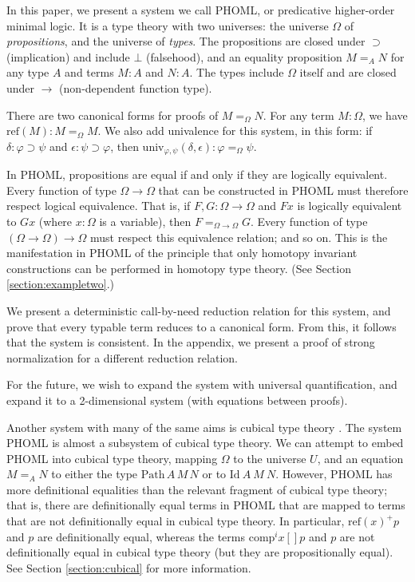 \documentclass[a4paper,UKenglish]{lipics-v2016}
\newcommand*{\reff}[1]{\ensuremath{\mathrm{ref} \left( {#1} \right)}}
\newcommand*{\univ}[4]{\ensuremath{\mathrm{univ}_{{#1}, {#2}} \left({#3} , {#4} \right)}}
\newcommand{\Path}[3]{\ensuremath{\mathrm{Path} \, {#1} \, {#2} \, {#3}}}
\theoremstyle{plain}
\theoremstyle{definition}
\begin{document}
In this paper, we present a system we call PHOML, or predicative higher-order minimal logic.  It is a type theory with two universes: the universe $\Omega$
of \emph{propositions}, and the universe of \emph{types}.  The propositions are closed under $\supset$ (implication) and include $\bot$ (falsehood), and an equality proposition $M =_A N$ for
any type $A$ and terms $M : A$ and $N : A$.  The types include $\Omega$ itself and are closed under $\rightarrow$ (non-dependent function type).

There are two canonical forms for proofs of $M =_\Omega N$.  For any term $M : \Omega$, we have $\reff{M} : M =_\Omega M$.  We also add univalence for this system, in this form:
if $\delta : \varphi \supset \psi$ and $\epsilon : \psi \supset\varphi$, then $\univ{\varphi}{\psi}{\delta}{\epsilon} : \varphi =_\Omega \psi$.  

In PHOML, propositions are equal if and only if they are logically equivalent.  Every function of type $\Omega \rightarrow \Omega$ that can be constructed in PHOML must therefore respect logical equivalence.  That is,
if $F, G : \Omega \rightarrow \Omega$ and $F x$ is logically equivalent to $G x$ (where $x : \Omega$ is a variable), then $F =_{\Omega \rightarrow \Omega} G$.  Every function of type $(\Omega \rightarrow \Omega) \rightarrow \Omega$ must respect this equivalence relation; and so on.  This is the manifestation in PHOML of the principle that only homotopy invariant constructions can be performed in homotopy type theory.  (See Section \ref{section:exampletwo}.)

We present a deterministic call-by-need reduction relation for this system, and prove that every typable term reduces to a canonical form.  From this, it follows that the system is consistent.  In the appendix, we present a proof of strong normalization for a different reduction relation.

For the future, we wish to expand the system with universal quantification, and expand it to a 2-dimensional system (with equations between proofs).

Another system with many of the same aims is cubical type theory \cite{cchm:cubical}.  The system PHOML is almost a subsystem of cubical type theory.  We can attempt to embed PHOML into cubical type theory,
mapping $\Omega$ to the universe $U$, and an equation $M =_A N$ to either the type $\Path{A}{M}{N}$ or to $\mathrm{Id}\ A\ M\ N$.  However, PHOML has more definitional equalities than the relevant fragment of cubical type theory; that is, there are definitionally equal terms in PHOML that are mapped to terms that are not definitionally equal in cubical type theory.  In particular, $\reff{x}^+ p$ and $p$ are definitionally equal, whereas the terms $\mathrm{comp}^i x [] p$ and $p$ are not definitionally equal in cubical type theory (but they are propositionally equal).  See Section \ref{section:cubical} for more information.
\end{document}
